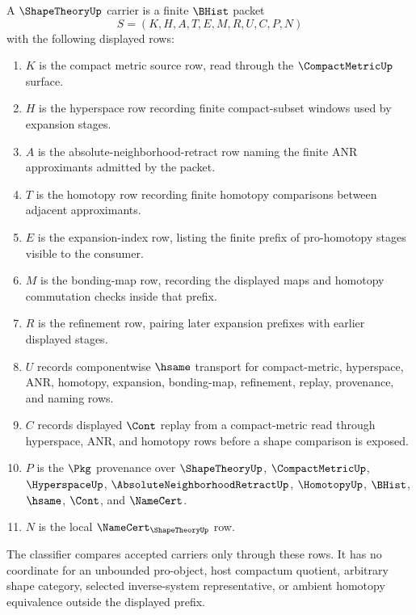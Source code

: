 \begin{definition}
\label{def:shape-theory-carrier}
A $\ShapeTheoryUp$ carrier is a finite $\BHist$ packet
$$
S=(K,H,A,T,E,M,R,U,C,P,N)
$$
with the following displayed rows:
\begin{enumerate}
\item $K$ is the compact metric source row, read through the $\CompactMetricUp$ surface.
\item $H$ is the hyperspace row recording finite compact-subset windows used by expansion stages.
\item $A$ is the absolute-neighborhood-retract row naming the finite ANR approximants admitted by the packet.
\item $T$ is the homotopy row recording finite homotopy comparisons between adjacent approximants.
\item $E$ is the expansion-index row, listing the finite prefix of pro-homotopy stages visible to the consumer.
\item $M$ is the bonding-map row, recording the displayed maps and homotopy commutation checks inside that prefix.
\item $R$ is the refinement row, pairing later expansion prefixes with earlier displayed stages.
\item $U$ records componentwise $\hsame$ transport for compact-metric, hyperspace, ANR, homotopy, expansion, bonding-map, refinement, replay, provenance, and naming rows.
\item $C$ records displayed $\Cont$ replay from a compact-metric read through hyperspace, ANR, and homotopy rows before a shape comparison is exposed.
\item $P$ is the $\Pkg$ provenance over $\ShapeTheoryUp$, $\CompactMetricUp$, $\HyperspaceUp$, $\AbsoluteNeighborhoodRetractUp$, $\HomotopyUp$, $\BHist$, $\hsame$, $\Cont$, and $\NameCert$.
\item $N$ is the local $\NameCert_{\ShapeTheoryUp}$ row.
\end{enumerate}
The classifier compares accepted carriers only through these rows. It has no coordinate for an unbounded pro-object, host compactum quotient, arbitrary shape category, selected inverse-system representative, or ambient homotopy equivalence outside the displayed prefix.
\end{definition}

